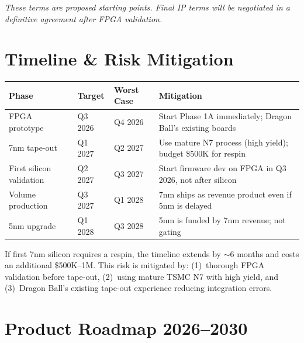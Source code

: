 \documentclass[11pt,a4paper]{article}
\begin{document}
\textit{These terms are proposed starting points. Final IP terms will be negotiated in a definitive agreement after FPGA validation.}

\section{Timeline \& Risk Mitigation}

\begin{center}
\begin{tabular}{@{}lllp{5.5cm}@{}}
\toprule
\textbf{Phase} & \textbf{Target} & \textbf{Worst Case} & \textbf{Mitigation} \\
\midrule
FPGA prototype & Q3 2026 & Q4 2026 & Start Phase 1A immediately; Dragon Ball's existing boards \\
7nm tape-out & Q1 2027 & Q2 2027 & Use mature N7 process (high yield); budget \$500K for respin \\
First silicon validation & Q2 2027 & Q3 2027 & Start firmware dev on FPGA in Q3 2026, not after silicon \\
Volume production & Q3 2027 & Q1 2028 & 7nm ships as revenue product even if 5nm is delayed \\
5nm upgrade & Q1 2028 & Q3 2028 & 5nm is funded by 7nm revenue; not gating \\
\bottomrule
\end{tabular}
\end{center}

\begin{keyinsight}
If first 7nm silicon requires a respin, the timeline extends by $\sim$6 months and costs an additional \$500K--1M. This risk is mitigated by: (1)~thorough FPGA validation before tape-out, (2)~using mature TSMC N7 with high yield, and (3)~Dragon Ball's existing tape-out experience reducing integration errors.
\end{keyinsight}

\section{Product Roadmap 2026--2030}
\end{document}
